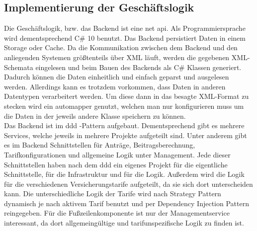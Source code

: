 \subsection{Implementierung der Geschäftslogik}
\label{geschaeftslogikimplementieren}
Die Geschäftslogik, bzw. das Backend ist eine \gls{net} \gls{api}. Als Programmiersprache wird dementsprechend C# 10 benutzt. Das Backend persistiert Daten in einem Storage oder Cache.  Da die Kommunikation zwischen dem Backend und den anliegenden Systemen größtenteils über XML läuft, werden die gegebenen XML-Schemata eingelesen und beim Bauen des Backends als C# Klassen generiert. Dadurch können die Daten einheitlich und einfach geparst und ausgelesen werden. Allerdings kann es trotzdem vorkommen, dass Daten in anderen Datentypen verarbeitert werden. Um diese dann in das besagte XML-Format zu stecken  wird ein \gls{automapper} genutzt, welchen man nur konfigurieren muss um die Daten in der jeweils andere Klasse speichern zu können.\\

Das Backend ist im \ac{ddd} -Pattern aufgebaut. Dementsprechend gibt es mehrere Services, welche jeweils in mehrere Projekte aufgeteilt sind. Unter anderem gibt es im Backend Schnittstellen für Anträge, Beitragsberechnung, Tarifkonfigurationen und allgemeine Logik unter Management. Jede dieser Schnittstellen haben nach dem \ac{ddd} ein eigenes Projekt für die eigentliche Schnittstelle, für die Infrastruktur und für die Logik. Außerdem wird die Logik für die verschiedenen Versicherungstarife aufgeteilt, da sie sich dort unterscheiden kann. Die unterschiedliche Logik der Tarife wird nach Strategy Pattern dynamisch je nach aktivem Tarif benutzt und per Dependency Injection Pattern reingegeben. Für die Fußzeilenkomponente ist nur der Managementservice interessant, da dort allgemeingültige und tarifunspezifische Logik zu finden ist.\\

